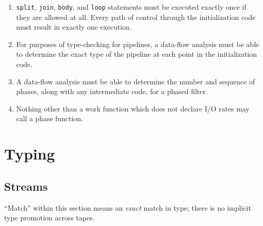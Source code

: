 \documentclass[11pt]{article}
\begin{document}
\begin{enumerate}
\item \lstinline|split|, \lstinline|join|, \lstinline|body|, and
  \lstinline|loop| statements must be executed exactly once if they
  are allowed at all.  Every path of control through the
  initialization code must result in exactly one execution.
\item For purposes of type-checking for pipelines, a data-flow
  analysis must be able to determine the exact type of the pipeline at
  each point in the initialization code.
\item A data-flow analysis must be able to determine the number and
  sequence of phases, along with any intermediate code, for a phased
  filter.
\item Nothing other than a work function which does not declare I/O
  rates may call a phase function.
\end{enumerate}

\section{Typing}

\subsection{Streams}

``Match'' within this section means an \emph{exact} match in type;
there is no implicit type promotion across tapes.
\end{document}
